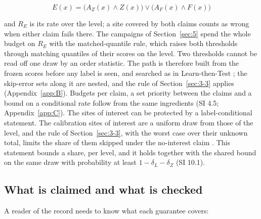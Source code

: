 \documentclass{iopjournal}
\begin{document}
\[
E(x) = \big(A_Z(x) \wedge Z(x)\big) \vee \big(A_F(x) \wedge F(x)\big)
\]

and \(R_E\) is its rate over the level; a site covered by both claims counts as wrong when either claim fails there. The campaigns of Section~\ref{sec:5} spend the whole budget on \(R_E\) with the matched-quantile rule, which raises both thresholds through matching quantiles of their scores on the level. Two thresholds cannot be read off one draw by an order statistic. The path is therefore built from the frozen scores before any label is seen, and searched as in Learn-then-Test \cite{Angelopoulos2025}; the skip-error sets along it are nested, and the rule of Section~\ref{sec:3-3} applies (Appendix~\ref{app:B}). Budgets per claim, a set priority between the claims and a bound on a conditional rate follow from the same ingredients (SI 4.5; Appendix~\ref{app:C}). The sites of interest can be protected by a label-conditional statement. The calibration sites of interest are a uniform draw from those of the level, and the rule of Section~\ref{sec:3-3}, with the worst case over their unknown total, limits the share of them skipped under the no-interest claim \cite{Vovk2005,Sadinle2019,Tong2018}. This statement bounds a share, per level, and it holds together with the shared bound on the same draw with probability at least \(1 - \delta_L - \delta_Z\) (SI 10.1).

\hypertarget{sec:3-5}{%
\subsection{What is claimed and what is checked}\label{sec:3-5}}

A reader of the record needs to know what each guarantee covers:
\end{document}
